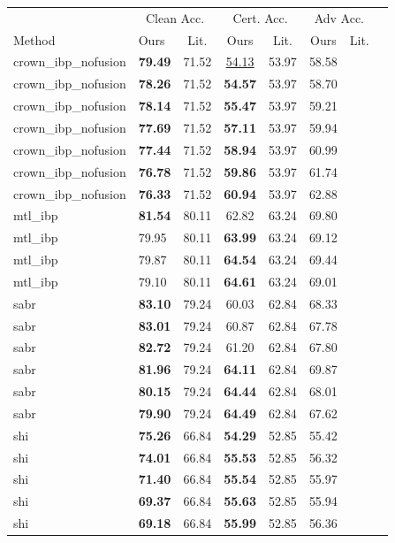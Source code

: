 \begin{tabular}{llcccccc}
\toprule
 & \multicolumn{2}{c}{Clean Acc.} & \multicolumn{2}{c}{Cert. Acc.} & \multicolumn{2}{c}{Adv Acc.} \\
Method & Ours & Lit. & Ours & Lit. & Ours & Lit. \\
\midrule
crown\_ibp\_nofusion & \textbf{79.49} & 71.52 & \underline{54.13} & 53.97 & 58.58 & \\
crown\_ibp\_nofusion & \textbf{78.26} & 71.52 & \textbf{54.57} & 53.97 & 58.70 & \\
crown\_ibp\_nofusion & \textbf{78.14} & 71.52 & \textbf{55.47} & 53.97 & 59.21 & \\
crown\_ibp\_nofusion & \textbf{77.69} & 71.52 & \textbf{57.11} & 53.97 & 59.94 & \\
crown\_ibp\_nofusion & \textbf{77.44} & 71.52 & \textbf{58.94} & 53.97 & 60.99 & \\
crown\_ibp\_nofusion & \textbf{76.78} & 71.52 & \textbf{59.86} & 53.97 & 61.74 & \\
crown\_ibp\_nofusion & \textbf{76.33} & 71.52 & \textbf{60.94} & 53.97 & 62.88 & \\
mtl\_ibp & \textbf{81.54} & 80.11 & 62.82 & 63.24 & 69.80 & \\
mtl\_ibp & 79.95 & 80.11 & \textbf{63.99} & 63.24 & 69.12 & \\
mtl\_ibp & 79.87 & 80.11 & \textbf{64.54} & 63.24 & 69.44 & \\
mtl\_ibp & 79.10 & 80.11 & \textbf{64.61} & 63.24 & 69.01 & \\
sabr & \textbf{83.10} & 79.24 & 60.03 & 62.84 & 68.33 & \\
sabr & \textbf{83.01} & 79.24 & 60.87 & 62.84 & 67.78 & \\
sabr & \textbf{82.72} & 79.24 & 61.20 & 62.84 & 67.80 & \\
sabr & \textbf{81.96} & 79.24 & \textbf{64.11} & 62.84 & 69.87 & \\
sabr & \textbf{80.15} & 79.24 & \textbf{64.44} & 62.84 & 68.01 & \\
sabr & \textbf{79.90} & 79.24 & \textbf{64.49} & 62.84 & 67.62 & \\
shi & \textbf{75.26} & 66.84 & \textbf{54.29} & 52.85 & 55.42 & \\
shi & \textbf{74.01} & 66.84 & \textbf{55.53} & 52.85 & 56.32 & \\
shi & \textbf{71.40} & 66.84 & \textbf{55.54} & 52.85 & 55.97 & \\
shi & \textbf{69.37} & 66.84 & \textbf{55.63} & 52.85 & 55.94 & \\
shi & \textbf{69.18} & 66.84 & \textbf{55.99} & 52.85 & 56.36 & \\
\bottomrule
\end{tabular}